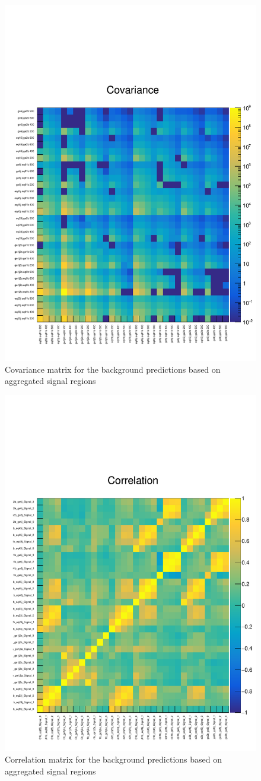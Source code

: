 \clearpage
\begin{figure}[h!]
  \centering
  \caption{Covariance matrix for the background
    predictions based on aggregated signal regions} 
  \label{fig:covarmatrix}
  \includegraphics[width=0.5\linewidth]{figures/results/36invfb_approval/aggregated/covariance}
\end{figure}

\begin{figure}[h!]
  \centering
  \caption{Correlation matrix for the background
    predictions based on aggregated signal regions} 
  \label{fig:corrmatrix}
  \includegraphics[width=0.5\linewidth]{figures/results/36invfb_approval/aggregated/correlation}
\end{figure}
